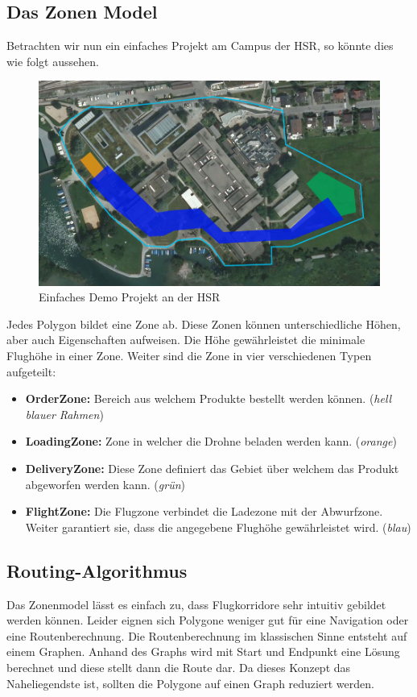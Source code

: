 \subsection{Das Zonen Model}
Betrachten wir nun ein einfaches Projekt am Campus der HSR, so könnte dies wie folgt aussehen. 
\begin{figure}[H]
	\includegraphics[width=1.0\textwidth]{images/routing/simpleProject_example.png}
	\caption{Einfaches Demo Projekt an der HSR}
	\label{fig:demo-project}
\end{figure}
Jedes Polygon bildet eine Zone ab. Diese Zonen können unterschiedliche Höhen, aber auch Eigenschaften aufweisen. Die Höhe gewährleistet die minimale Flughöhe in einer Zone. Weiter sind die Zone in vier verschiedenen Typen aufgeteilt: 
\begin{itemize}
	\item{\textbf{OrderZone:} Bereich aus welchem Produkte bestellt werden können. (\textit{hell blauer Rahmen})}
	\item{\textbf{LoadingZone:} Zone in welcher die Drohne beladen werden kann. (\textit{orange})}
	\item{\textbf{DeliveryZone:} Diese Zone definiert das Gebiet über welchem das Produkt abgeworfen werden kann. (\textit{grün})}
	\item{\textbf{FlightZone:} Die Flugzone verbindet die Ladezone mit der Abwurfzone. Weiter garantiert sie, dass die angegebene Flughöhe gewährleistet wird. (\textit{blau})}
\end{itemize}

\subsection{Routing-Algorithmus}
Das Zonenmodel lässt es einfach zu, dass Flugkorridore sehr intuitiv gebildet werden können. Leider eignen sich Polygone weniger gut für eine Navigation oder eine Routenberechnung. Die Routenberechnung im klassischen Sinne entsteht auf einem Graphen. Anhand des Graphs wird mit Start und Endpunkt eine Lösung berechnet und diese stellt dann die Route dar. Da dieses Konzept das Naheliegendste ist, sollten die Polygone auf einen Graph reduziert werden.

